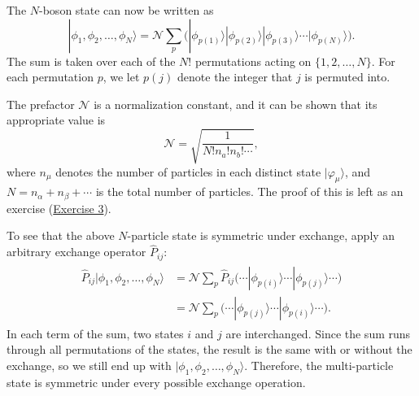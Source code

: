 \documentclass[pra,12pt]{revtex4}
\begin{document}
The $N$-boson state can now be written as
\begin{equation}
  |\phi_1,\phi_2,\dots,\phi_N\rangle = \mathcal{N} \sum_p
  \Big(|\phi_{p(1)}\rangle  |\phi_{p(2)}\rangle  |\phi_{p(3)}\rangle  \cdots
  |\phi_{p(N)}\rangle\Big).
  \label{nbosons}
\end{equation}
The sum is taken over each of the $N!$ permutations acting on
$\{1,2,\dots,N\}$.  For each permutation $p$, we let $p(j)$ denote the
integer that $j$ is permuted into.

The prefactor $\mathcal{N}$ is a normalization constant, and it can be
shown that its appropriate value is
\begin{equation}
  \mathcal{N} = \sqrt{\frac{1}{N!n_a!n_b!\cdots}},
\end{equation}
where $n_\mu$ denotes the number of particles in each distinct state
$|\varphi_\mu\rangle$, and $N = n_\alpha + n_\beta + \cdots$ is the
total number of particles.  The proof of this is left as an exercise
(\hyperref[ex:boson_norm]{Exercise 3}).

To see that the above $N$-particle state is symmetric under exchange,
apply an arbitrary exchange operator $\hat{P}_{ij}$:
\begin{align}
  \begin{aligned}\hat{P}_{ij}|\phi_1,\phi_2,\dots,\phi_N\rangle &= \mathcal{N} \sum_p \hat{P}_{ij} \Big(\cdots  |\phi_{p(i)}\rangle  \cdots  |\phi_{p(j)}\rangle\cdots\Big) \\&= \mathcal{N} \sum_p \Big(\cdots  |\phi_{p(j)}\rangle  \cdots  |\phi_{p(i)}\rangle\cdots\Big).\end{aligned}
\end{align}
In each term of the sum, two states $i$ and $j$ are interchanged.
Since the sum runs through all permutations of the states, the result
is the same with or without the exchange, so we still end up with
$|\phi_1,\phi_2,\dots,\phi_N\rangle$.  Therefore, the multi-particle
state is symmetric under every possible exchange operation.
\end{document}
